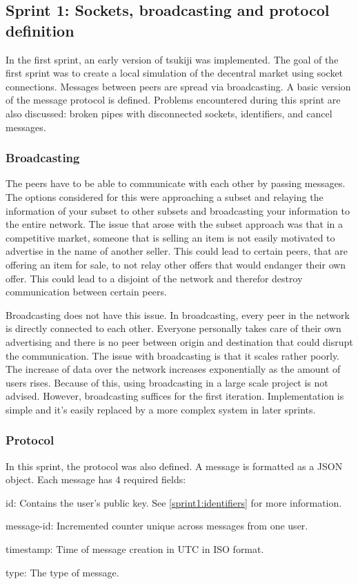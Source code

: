 \subsection{Sprint 1: Sockets, broadcasting and protocol definition}
In the first sprint, an early version of tsukiji was implemented. The goal of the first sprint was to create a local simulation of the decentral market using socket connections. Messages between peers are spread via broadcasting. A basic version of the message protocol is defined. Problems encountered during this sprint are also discussed: broken pipes with disconnected sockets, identifiers, and cancel messages.

\subsubsection{Broadcasting}
The peers have to be able to communicate with each other by passing messages.
The options considered for this were approaching a subset and relaying the information of your subset to other subsets and broadcasting your information to the entire network.
The issue that arose with the subset approach was that in a competitive market, someone that is selling an item is not easily motivated to advertise in the name of another seller.
This could lead to certain peers, that are offering an item for sale, to not relay other offers that would endanger their own offer.
This could lead to a disjoint of the network and therefor destroy communication between certain peers.

Broadcasting does not have this issue.
In broadcasting, every peer in the network is directly connected to each other.
Everyone personally takes care of their own advertising and there is no peer between origin and destination that could disrupt the communication.
The issue with broadcasting is that it scales rather poorly.
The increase of data over the network increases exponentially as the amount of users rises.
Because of this, using broadcasting in a large scale project is not advised.
However, broadcasting suffices for the first iteration.
Implementation is simple and it's easily replaced by a more complex system in later sprints.

\subsubsection{Protocol}

In this sprint, the protocol was also defined.
A message is formatted as a JSON object.
Each message has 4 required fields:
\begin{myitemize}
\item id: Contains the user's public key. See \ref{sprint1:identifiers} for more information.
\item message-id: Incremented counter unique across messages from one user.
\item timestamp: Time of message creation in UTC in ISO format.
\item type: The type of message.
\end{myitemize}

